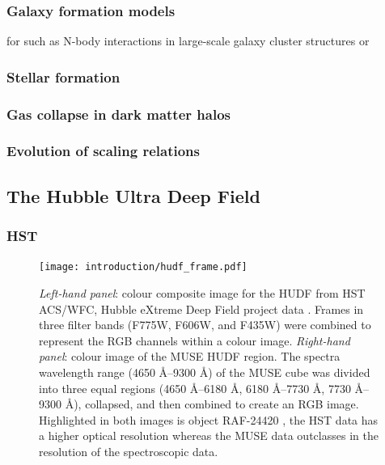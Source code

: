 \documentclass[12pt, twocolumn]{revtex4-1}    %
\begin{document}
\subsubsection{Galaxy formation models}

for such as N-body interactions in large-scale galaxy cluster structures or 

\subsubsection{Stellar formation}

\subsubsection{Gas collapse in dark matter halos}

\subsubsection{Evolution of scaling relations}

\subsection{The Hubble Ultra Deep Field}

\subsubsection{HST}

\begin{figure}
\texttt{[image: introduction/hudf\_frame.pdf]}
\captionsetup{justification=justified, format=plain}
\caption[Hubble Ultra Deep Field]{\textit{Left-hand panel}: colour composite image for the HUDF from HST ACS/WFC, Hubble eXtreme Deep Field project data \citep{2013ApJS..209....6I}. Frames in three filter bands (F775W, F606W, and F435W) were combined to represent the RGB channels within a colour image. \textit{Right-hand panel}: colour image of the MUSE HUDF region. The spectra wavelength range (4650 \AA--9300 \AA) of the MUSE cube was divided into three equal regions (4650 \AA--6180 \AA, 6180 \AA--7730 \AA, 7730 \AA -- 9300 \AA), collapsed, and then combined to create an RGB image. Highlighted in both images is object RAF-24420 \citep{2015AJ....150...31R}, the HST data has a higher optical resolution whereas the MUSE data outclasses in the resolution of the spectroscopic data.}
\label{fig:hst_muse_hdf}
\end{figure}
\end{document}
